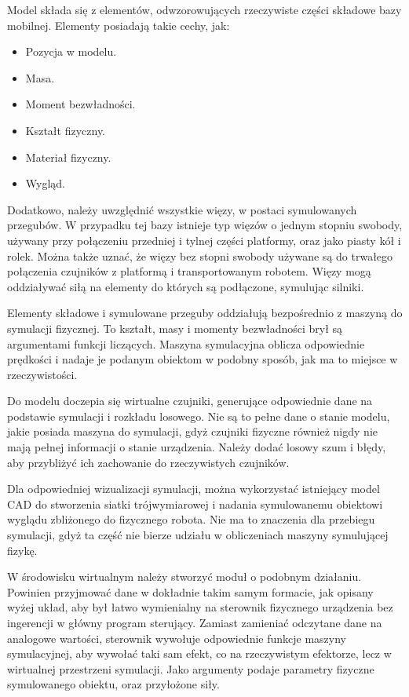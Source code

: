 	Model składa się z elementów, odwzorowujących rzeczywiste części składowe bazy mobilnej.
	Elementy posiadają takie cechy, jak:
	\begin{itemize}
		\item Pozycja w modelu.
		\item Masa.
		\item Moment bezwładności.
		\item Kształt fizyczny.
		\item Materiał fizyczny.
		\item Wygląd.
	\end{itemize}

	Dodatkowo, należy uwzględnić wszystkie więzy, w postaci symulowanych przegubów.
	W przypadku tej bazy istnieje typ więzów o jednym stopniu swobody, używany przy połączeniu przedniej i tylnej części platformy, oraz 
	jako piasty kół i rolek. Można także uznać, że więzy bez stopni swobody używane są do trwałego połączenia czujników z platformą i transportowanym robotem.
	Więzy mogą oddziaływać siłą na elementy do których są podłączone, symulując silniki.

	Elementy składowe i symulowane przeguby oddziałują bezpośrednio z maszyną do symulacji fizycznej. 
	To kształt, masy i momenty bezwładności brył są argumentami funkcji liczących.
	Maszyna symulacyjna oblicza odpowiednie prędkości i nadaje je podanym obiektom w podobny sposób, jak ma to miejsce w rzeczywistości.

	Do modelu doczepia się wirtualne czujniki, generujące odpowiednie dane na podstawie symulacji i rozkładu losowego.
	Nie są to pełne dane o stanie modelu, jakie posiada maszyna do symulacji, gdyż czujniki fizyczne również nigdy nie mają pełnej informacji o stanie urządzenia.
	Należy dodać losowy szum i błędy, aby przybliżyć ich zachowanie do rzeczywistych czujników.

	Dla odpowiedniej wizualizacji symulacji, można wykorzystać istniejący model CAD do stworzenia siatki trójwymiarowej i nadania symulowanemu obiektowi wyglądu zbliżonego do fizycznego robota. Nie ma to znaczenia dla przebiegu symulacji, gdyż ta część nie bierze udziału w obliczeniach maszyny symulującej fizykę.

	W środowisku wirtualnym należy stworzyć moduł o podobnym działaniu.
	Powinien przyjmować dane w dokładnie takim samym formacie, jak opisany wyżej układ, aby był łatwo wymienialny na sterownik fizycznego urządzenia bez ingerencji w główny program sterujący.
	Zamiast zamieniać odczytane dane na analogowe wartości, sterownik wywołuje odpowiednie funkcje maszyny symulacyjnej, aby wywołać taki sam efekt, co na rzeczywistym efektorze, lecz w wirtualnej przestrzeni symulacji.
	Jako argumenty podaje parametry fizyczne symulowanego obiektu, oraz przyłożone siły.


